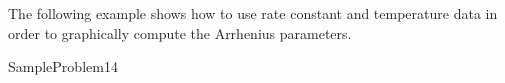 \documentclass[main.tex]{subfiles}
\newcommand\chapterlabel{Ch-kinetics}
\begin{document}
\begin{description}



The following example shows how to use rate constant and temperature data in order to graphically compute the Arrhenius parameters.


  {SampleProblem14}

\end{description}
\end{document}

